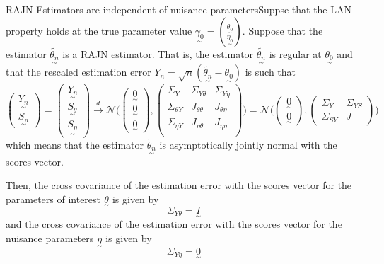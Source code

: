 \documentclass[twoside]{article}
\newcommand{\utilde}{\underset{\sim}}
\begin{document}
\begin{proposition_exam}{RAJN Estimators are independent of nuisance parameters}{}Suppse that the LAN property holds at the true parameter value $\utilde{\gamma_0} = {\utilde{\theta_0} \choose \utilde{\eta_0}}$. Suppose that the estimator $\utilde{\tilde{\theta_n}}$ is a RAJN estimator. That is, the estimator $\utilde{\tilde{\theta_n}}$ is regular at $\utilde{\theta_0}$ and that the rescaled estimation error $Y_n = \sqrt{n}(\utilde{\tilde{\theta_n}} - \utilde{\theta_0})$ is such that 
$$
\begin{pmatrix}
\utilde{Y_n} \\
\utilde{S_n}
\end{pmatrix}
=
\begin{pmatrix}
\utilde{Y_n}\\
\utilde{S_{\theta}}\\
\utilde{S_{\eta}}
\end{pmatrix}
\xrightarrow{d}
\mathcal{N}
\bigg( 
\begin{pmatrix}
\utilde{0}\\
\utilde{0}\\
\utilde{0}
\end{pmatrix}
,
\begin{pmatrix}
\Sigma_Y & \Sigma_{Y \theta} & \Sigma_{Y\eta}\\
\Sigma_{\theta Y} & J_{\theta \theta} & J_{\theta \eta}\\
\Sigma_{\eta Y} & J_{\eta \theta} & J_{\eta\eta}\\
\end{pmatrix}
\bigg)
= 
\mathcal{N}
\bigg( 
\begin{pmatrix}
\utilde{0}\\
\utilde{0}
\end{pmatrix}
,
\begin{pmatrix}
\Sigma_Y & \Sigma_{Y S}\\
\Sigma_{S Y} & J
\end{pmatrix}
\bigg)
$$
which means that the estimator $\utilde{\tilde{\theta_n}}$ is asymptotically jointly normal with the scores vector. 

Then, the cross covariance of the estimation error with the scores vector for the parameters of interest $\utilde{\theta}$ is given by
$$
\Sigma_{Y \theta} = \utilde{I}
$$
and the cross covariance of the estimation error with the scores vector for the nuisance parameters $\utilde{\eta}$ is given by
$$
\Sigma_{Y \eta} = \utilde{0}
$$
\end{proposition_exam}
\end{document}
